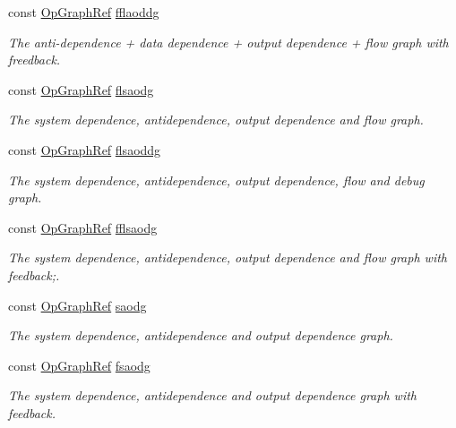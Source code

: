 \begin{DoxyCompactItemize}
const \hyperlink{op__graph_8hpp_aee97c95c40f791b60c451d9e29c72d39}{Op\+Graph\+Ref} \hyperlink{classFunctionBehavior_a44d3fd29ffe2e6d10082a2df48e2a813}{fflaoddg}
\begin{DoxyCompactList}\small\item\em The anti-\/dependence + data dependence + output dependence + flow graph with freedback. \end{DoxyCompactList}\item 
const \hyperlink{op__graph_8hpp_aee97c95c40f791b60c451d9e29c72d39}{Op\+Graph\+Ref} \hyperlink{classFunctionBehavior_a8086f33f4edd8e2ec8081fb3cf043114}{flsaodg}
\begin{DoxyCompactList}\small\item\em The system dependence, antidependence, output dependence and flow graph. \end{DoxyCompactList}\item 
const \hyperlink{op__graph_8hpp_aee97c95c40f791b60c451d9e29c72d39}{Op\+Graph\+Ref} \hyperlink{classFunctionBehavior_a0d478c76139ce36a5bc221860dcc9280}{flsaoddg}
\begin{DoxyCompactList}\small\item\em The system dependence, antidependence, output dependence, flow and debug graph. \end{DoxyCompactList}\item 
const \hyperlink{op__graph_8hpp_aee97c95c40f791b60c451d9e29c72d39}{Op\+Graph\+Ref} \hyperlink{classFunctionBehavior_a488c30f3e859890901121cc73115cfb2}{fflsaodg}
\begin{DoxyCompactList}\small\item\em The system dependence, antidependence, output dependence and flow graph with feedback;. \end{DoxyCompactList}\item 
const \hyperlink{op__graph_8hpp_aee97c95c40f791b60c451d9e29c72d39}{Op\+Graph\+Ref} \hyperlink{classFunctionBehavior_afe08fc227e99bce22580fc82d89fd6af}{saodg}
\begin{DoxyCompactList}\small\item\em The system dependence, antidependence and output dependence graph. \end{DoxyCompactList}\item 
const \hyperlink{op__graph_8hpp_aee97c95c40f791b60c451d9e29c72d39}{Op\+Graph\+Ref} \hyperlink{classFunctionBehavior_a9a8446266ad8efcd206f51bed66584ca}{fsaodg}
\begin{DoxyCompactList}\small\item\em The system dependence, antidependence and output dependence graph with feedback. \end{DoxyCompactList}\item 

\end{DoxyCompactItemize}
